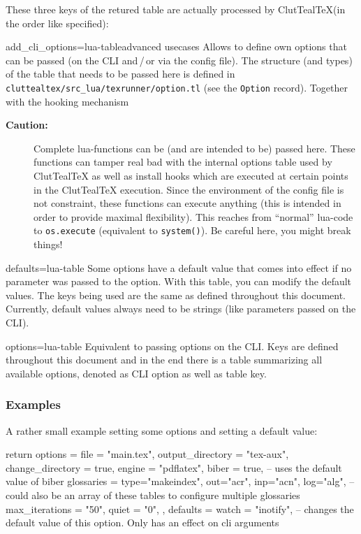 \documentclass[a4paper, 11pt]{scrartcl}
\let\TeXold\TeX
\newcommand\CluttealTeX{ClutTeal\TeX\xspace}
\renewcommand\TeX{\TeXold\xspace}
\begin{document}
These three keys of the retured table are actually processed by \CluttealTeX (in the order like specified):
\begin{docKey}[configFile][
	]{add_cli_options}{=lua-table}{advanced usecases}
	Allows to define own options that can be passed (on the CLI and\,/\,or via the config file).
	The structure (and types) of the table that needs to be passed here is defined in \texttt{cluttealtex/src\_lua/texrunner/option.tl} (see the \texttt{Option} record).
	Together with the hooking mechanism 
	\begin{description}
		\item[\textcolor{CtpRed}{\bfseries\sffamily Caution:}] Complete lua-functions can be (and are intended to be) passed here.
			These functions can tamper real bad with the internal options table used by \CluttealTeX as well as install hooks which are executed at certain points in the \CluttealTeX execution.
			Since the environment of the config file is not constraint, these functions can execute anything (this is intended in order to provide maximal flexibility).
			This reaches from \enquote{normal} lua-code to \texttt{os.execute} (equivalent to \texttt{system()}).
			Be careful here, you might break things!
	\end{description}
\end{docKey}
\begin{docKey}[configFile][
	]{defaults}{=lua-table}{}
	Some options have a default value that comes into effect if no parameter was passed to the option.
	With this table, you can modify the default values.
	The keys being used are the same as defined throughout this document.
	Currently, default values always need to be strings (like parameters passed on the CLI).
\end{docKey}
\begin{docKey}[configFile][
	]{options}{=lua-table}{}
	Equivalent to passing options on the CLI.
	Keys are defined throughout this document and in the end there is a table summarizing all available options, denoted as CLI option as well as table key.
\end{docKey}

\subsubsection{Examples}
A rather small example setting some options and setting a default value:
\begin{boxcode}[{[5.3]Lua}]
return {
	options = {
		file = "main.tex",
		output_directory = "tex-aux",
		change_directory = true,
		engine = "pdflatex",
		biber = true, -- uses the default value of biber
		glossaries = {type="makeindex", out="acr", inp="acn", log="alg"}, -- could also be an array of these tables to configure multiple glossaries
		max_iterations = "50",
		quiet = "0",
	},
	defaults = {
		watch = "inotify", -- changes the default value of this option. Only has an effect on cli arguments 
	}
}
\end{boxcode}
\end{document}
